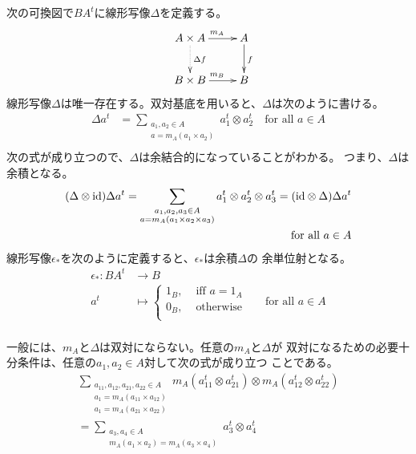 	次の可換図で$BA^t$に線形写像$\Delta$を定義する。
	\begin{equation}\xymatrix{
	}\quad\xymatrix{
		A\times A \ar@{.>}[d]^{\Delta f} \ar[r]^{m_A} & A \ar[d]^{f} \\
		B\times B \ar[r]^{m_B} & B \\
	}\end{equation}
	線形写像$\Delta$は唯一存在する。双対基底を用いると、$\Delta$は次のように書ける。
	\begin{equation}\begin{split} %
		\Delta a^t &= \sum_{\substack{a_1,a_2\in A\\ a=m_A(a_1\times a_2)}}a_1^t\otimes a_2^t \quad \text{for all }a\in A \\
	\end{split}\end{equation} %
	次の式が成り立つので、$\Delta$は余結合的になっていることがわかる。
	つまり、$\Delta$は余積となる。
	\begin{equation*}\begin{split} %
		(\Delta\otimes \myid)\Delta a^t
		= \sum_{\substack{a_1,a_2,a_3\in A \\ a=m_A(a_1\times a_2\times a_3)}}a_1^t\otimes a_2^t\otimes a_3^t
		= (\myid\otimes \Delta)\Delta a^t \\
		\text{for all }a\in A \\
	\end{split}\end{equation*} %
	線形写像$\epsilon_*$を次のように定義すると、$\epsilon_*$は余積$\Delta$の
	余単位射となる。
	\begin{equation}\begin{split} %
		\epsilon_*: BA^t &\to B \\
			a^t &\mapsto \begin{cases}
				1_B, &\text{ iff } a = 1_A \\
				0_B, &\text{ otherwise } \\
			\end{cases}\quad \text{ for all }a\in A \\
	\end{split}\end{equation} %

	一般には、$m_A$と$\Delta$は双対にならない。任意の$m_A$と$\Delta$が
	双対になるための必要十分条件は、任意の$a_1,a_2\in A$対して次の式が成り立つ
	ことである。
	\begin{equation}\begin{split} %
		\sum_{\substack{a_{11},a_{12},a_{21},a_{22}\in A \\ a_1=m_A(a_{11}\times a_{12})\\ a_1=m_A(a_{21}\times a_{22})}}m_A(a_{11}^t\otimes a_{21}^t)\otimes m_A(a_{12}^t\otimes a_{22}^t) \\
		= \sum_{\substack{a_3,a_4\in A \\ m_A(a_1\times a_2)=m_A(a_3\times a_4)}}a_3^t\otimes a_4^t 
	\end{split}\end{equation} %

